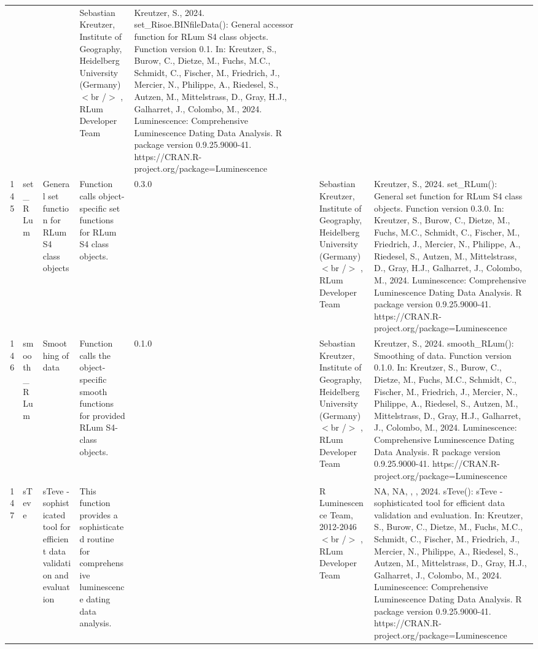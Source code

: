 \begin{table}[ht]
\begin{tabular}{rllllllll}
 &  &  & Sebastian Kreutzer, Institute of Geography, Heidelberg University (Germany)$<$br /$>$ , RLum Developer Team & Kreutzer, S., 2024. set\_Risoe.BINfileData(): General accessor function for RLum S4 class objects. Function version 0.1. In: Kreutzer, S., Burow, C., Dietze, M., Fuchs, M.C., Schmidt, C., Fischer, M., Friedrich, J., Mercier, N., Philippe, A., Riedesel, S., Autzen, M., Mittelstrass, D., Gray, H.J., Galharret, J., Colombo, M., 2024. Luminescence: Comprehensive Luminescence Dating Data Analysis. R package version 0.9.25.9000-41. https://CRAN.R-project.org/package=Luminescence
 \\ 
  145 & set\_RLum & General set function for RLum S4 class objects & Function calls object-specific set functions for RLum S4 class objects. & 0.3.0
 &  &  & Sebastian Kreutzer, Institute of Geography, Heidelberg University (Germany)$<$br /$>$ , RLum Developer Team & Kreutzer, S., 2024. set\_RLum(): General set function for RLum S4 class objects. Function version 0.3.0. In: Kreutzer, S., Burow, C., Dietze, M., Fuchs, M.C., Schmidt, C., Fischer, M., Friedrich, J., Mercier, N., Philippe, A., Riedesel, S., Autzen, M., Mittelstrass, D., Gray, H.J., Galharret, J., Colombo, M., 2024. Luminescence: Comprehensive Luminescence Dating Data Analysis. R package version 0.9.25.9000-41. https://CRAN.R-project.org/package=Luminescence
 \\ 
  146 & smooth\_RLum & Smoothing of data & Function calls the object-specific smooth functions for provided RLum S4-class objects. & 0.1.0
 &  &  & Sebastian Kreutzer, Institute of Geography, Heidelberg University (Germany)$<$br /$>$ , RLum Developer Team & Kreutzer, S., 2024. smooth\_RLum(): Smoothing of data. Function version 0.1.0. In: Kreutzer, S., Burow, C., Dietze, M., Fuchs, M.C., Schmidt, C., Fischer, M., Friedrich, J., Mercier, N., Philippe, A., Riedesel, S., Autzen, M., Mittelstrass, D., Gray, H.J., Galharret, J., Colombo, M., 2024. Luminescence: Comprehensive Luminescence Dating Data Analysis. R package version 0.9.25.9000-41. https://CRAN.R-project.org/package=Luminescence
 \\ 
  147 & sTeve & sTeve - sophisticated tool for efficient data validation and evaluation & This function provides a sophisticated routine for comprehensive luminescence dating data analysis. &  &  &  & R Luminescence Team, 2012-2046$<$br /$>$ , RLum Developer Team & NA, NA, , , 2024. sTeve(): sTeve - sophisticated tool for efficient data validation and evaluation. In: Kreutzer, S., Burow, C., Dietze, M., Fuchs, M.C., Schmidt, C., Fischer, M., Friedrich, J., Mercier, N., Philippe, A., Riedesel, S., Autzen, M., Mittelstrass, D., Gray, H.J., Galharret, J., Colombo, M., 2024. Luminescence: Comprehensive Luminescence Dating Data Analysis. R package version 0.9.25.9000-41. https://CRAN.R-project.org/package=Luminescence

\end{tabular}
\end{table}
